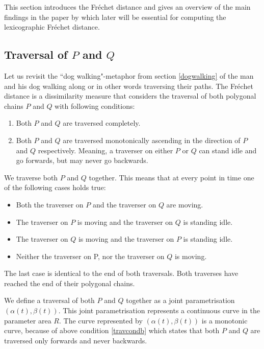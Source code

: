 This section introduces the Fréchet distance and gives an overview of the main  findings in the \citeyear{altgodau} paper  by \citeauthor*{altgodau}\cite{altgodau} which later will be essential for computing the lexicographic Fréchet distance.

\subsection{Traversal of $P$ and $Q$}

Let us revisit the ``dog walking"-metaphor from section \ref{dogwalking} of the man and his dog walking along or in other words traversing their paths. The Fréchet distance is a dissimilarity measure that considers the traversal of both polygonal chains $P$ and $Q$ with following conditions:
\begin{enumerate}[label=(\Alph*)]
	\item Both $P$ and $Q$ are traversed completely.
	\item Both $P$ and $Q$ are traversed monotonically ascending in the direction of $P$ and $Q$ respectively. Meaning, a traverser on either $P$ or $Q$ can stand idle and go forwards, but may never go backwards.\label{travcondb}
\end{enumerate}

We traverse both $P$ and $Q$ together. This means that at every point in time one of the following cases holds true:
\begin{itemize}
	\item Both the traverser on $P$ and the traverser on $Q$ are moving.
	\item The traverser on $P$ is moving and the traverser on $Q$ is standing idle.
	\item The traverser on $Q$ is moving and the traverser on $P$ is standing idle.
	\item Neither the traverser on P, nor the traverser on $Q$ is moving.
\end{itemize}

The last case is identical to the end of both traversals. Both traverses have reached the end of their polygonal chains.

We define a traversal of both $P$ and $Q$ together as a joint parametrisation $(\alpha(t), \beta(t))$. This joint parametrisation represents a continuous curve in the parameter area $R$. The curve represented by $(\alpha(t), \beta(t))$ is a monotonic curve, because of above condition \ref{travcondb} which states that both $P$ and $Q$ are traversed only forwards and never backwards.

